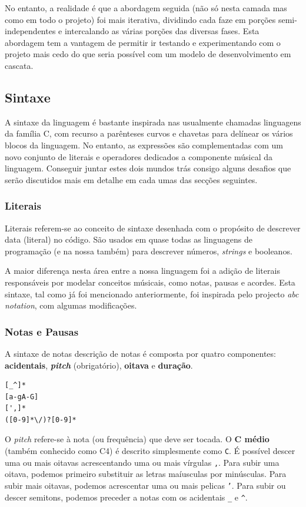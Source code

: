 No entanto, a realidade é que a abordagem seguida (não só nesta camada mas como em todo o projeto) foi mais iterativa, dividindo cada faze em porções semi-independentes e intercalando as várias porções das diversas fases. Esta abordagem tem a vantagem de permitir ir testando e experimentando com o projeto mais cedo do que seria possível com um modelo de desenvolvimento em cascata.
\subsection{Sintaxe}
A sintaxe da linguagem é bastante inspirada nas usualmente chamadas linguagens da família C, com recurso a parênteses curvos e chavetas para delínear os vários blocos da linguagem. No entanto, as expressões são complementadas com um novo conjunto de literais e operadores dedicados a componente músical da linguagem. Conseguir juntar estes dois mundos trás consigo alguns desafios que serão discutidos mais em detalhe em cada umas das secções seguintes.

\subsubsection{\textbf{Literais}}
Literais referem-se ao conceito de sintaxe desenhada com o propósito de descrever data (literal) no código. São usados em quase todas as linguagens de programação (e na nossa também) para descrever números, \textit{strings} e booleanos.

A maior diferença nesta área entre a nossa linguagem foi a adição de literais responsáveis por modelar conceitos músicais, como notas, pausas e acordes. Esta sintaxe, tal como já foi mencionado anteriormente, foi inspirada pelo projecto \textit{abc notation}, com algumas modificações.

\subsubsection{\textbf{Notas e Pausas}}
A sintaxe de notas descrição de notas é composta por quatro componentes: \textbf{acidentais}, \textbf{\textit{pitch}} (obrigatório), \textbf{oitava} e \textbf{duração}.

\begin{lstlisting}[caption=Expressão regular que identifica uma nota (quebras de linha apenas para claridade de leitura)]
[_^]*
[a-gA-G]
[',]*
([0-9]*\/)?[0-9]*
\end{lstlisting}

O \textit{pitch} refere-se à nota (ou frequência) que deve ser tocada. O \textbf{C médio} (também conhecido como C4) é descrito simplesmente como \texttt{C}. É possível descer uma ou mais oitavas acrescentando uma ou mais vírgulas \texttt{,}. Para subir uma oitava, podemos primeiro substituir as letras maíusculas por minúsculas. Para subir mais oitavas, podemos acrescentar uma ou mais pelicas \texttt{'}. Para subir ou descer semitons, podemos preceder a notas com os acidentais \texttt{\_} e \texttt{\^}.

